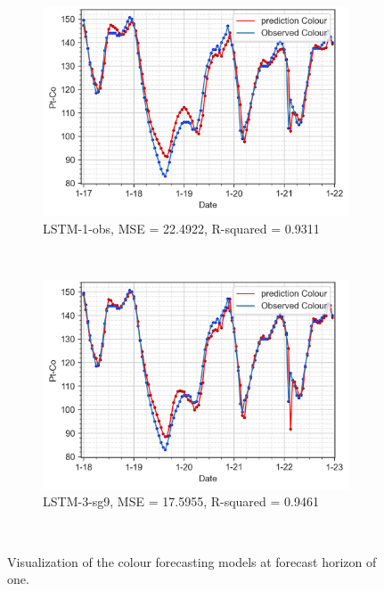 \begin{figure}[!ht]
  \centering
  \begin{subfigure}[t]{0.7\textwidth}
    \includegraphics[width=\linewidth]{imgs/results/steps/colour-lstm-1-fc1.png}
    \caption{LSTM-1-obs, MSE = 22.4922, R-squared = 0.9311} \label{fig:colour-lstm-1-fc1}
  \end{subfigure}\\
  \vspace{1em}
  \begin{subfigure}[t]{0.7\textwidth}
    \includegraphics[width=\linewidth]{imgs/results/steps/colour-lstm-3-fc1.png}
    \caption{LSTM-3-sg9, MSE = 17.5955, R-squared = 0.9461} \label{fig:colour-lstm-3-fc1}
  \end{subfigure}\\
\caption{Visualization of the colour forecasting models at forecast horizon of one.} \label{fig:colour-forecast-fc1}
\end{figure}

